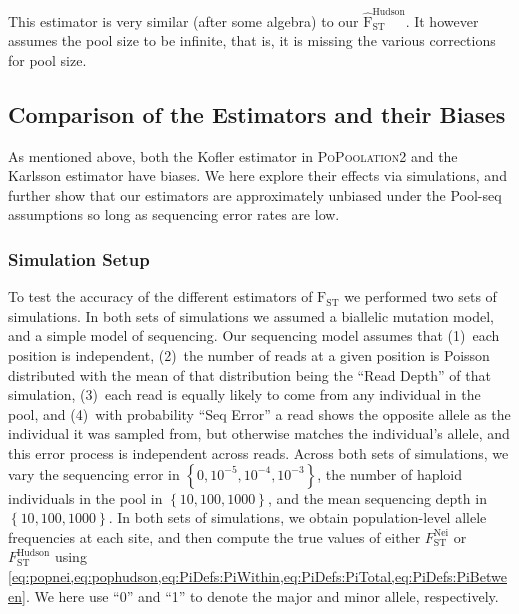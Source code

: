 \documentclass[letterpaper,fontsize=9pt,DIV=12]{scrartcl}
\newcommand\toolname{\textsc}
\newcommand{\neifst}{F_\text{ST}^\text{Nei}}
\newcommand{\hudsonfst}{F_\text{ST}^\text{Hudson}}
\begin{document}
This estimator is very similar (after some algebra) to our $\widehat{\text{F}}_\text{ST}^\text{Hudson}$.
It however assumes the pool size to be infinite, that is, it is missing the various corrections for pool size.


\subsection{Comparison of the Estimators and their Biases}
\label{supp:sec:FST:sub:Comparison}

As mentioned above, both the Kofler estimator in \toolname{PoPoolation2} and the Karlsson estimator have biases.
We here explore their effects via simulations, and further show that our estimators are approximately unbiased under the Pool-seq assumptions so long as sequencing error rates are low.


\subsubsection*{Simulation Setup}
\label{supp:sec:FST:sub:Comparison:sub:Simulations}

To test the accuracy of the different estimators of $\text{F}_\text{ST}$ we performed two sets of simulations.  In both sets of simulations we assumed a biallelic mutation model, and a simple model of sequencing.  Our sequencing model assumes that (1)~each position is independent, (2)~the number of reads at a given position is Poisson distributed with the mean of that distribution being the ``Read Depth'' of that simulation, (3)~each read is equally likely to come from any individual in the pool, and (4)~with probability ``Seq Error'' a read shows the opposite allele as the individual it was sampled from, but otherwise matches the individual's allele, and this error process is independent across reads.  Across both sets of simulations, we vary the sequencing error in $\left\{0, 10^{-5}, 10^{-4}, 10^{-3}\right\}$, the number of haploid individuals in the pool in $\left\{10, 100, 1000\right\}$, and the mean sequencing depth in $\left\{10, 100, 1000\right\}$.  In both sets of simulations, we obtain population-level allele frequencies at each site, and then compute the true values of either $\neifst$ or $\hudsonfst$ using \cref{eq:popnei,eq:pophudson,eq:PiDefs:PiWithin,eq:PiDefs:PiTotal,eq:PiDefs:PiBetween}.
We here use ``0'' and ``1'' to denote the major and minor allele, respectively.
\end{document}
